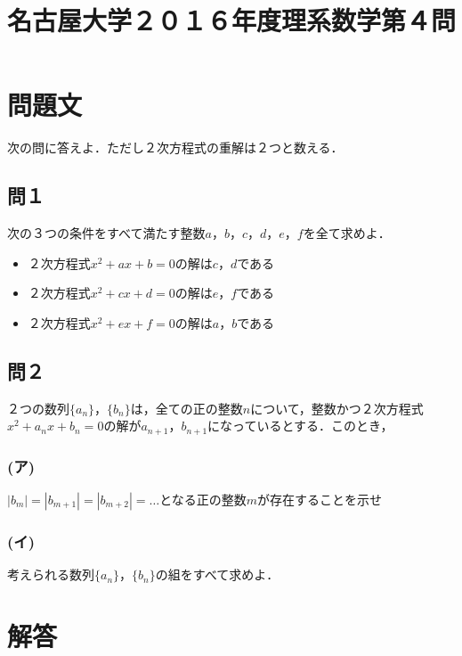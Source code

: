 \documentclass[../main]{subfiles}
\begin{document}
\title{名古屋大学２０１６年度理系数学第４問}
\date{}
\maketitle
\section{問題文}
次の問に答えよ．ただし２次方程式の重解は２つと数える．
\subsection*{問１}
次の３つの条件をすべて満たす整数$a$，$b$，$c$，$d$，$e$，$f$を全て求めよ．
\begin{itemize}
\item ２次方程式$x^{2}+ax+b=0$の解は$c$，$d$である
\item ２次方程式$x^{2}+cx+d=0$の解は$e$，$f$である
\item ２次方程式$x^{2}+ex+f=0$の解は$a$，$b$である
\end{itemize}
\subsection*{問２}
２つの数列$\{a_n\}$，$\{b_n\}$は，全ての正の整数$n$について，整数かつ２次方程式$x^{2}+a_{n}x+b_{n}=0$の解が$a_{n+1}$，$b_{n+1}$になっているとする．このとき，
\subsubsection*{(ア)}$|b_m|=|b_{m+1}|=|b_{m+2}|=\dots$となる正の整数$m$が存在することを示せ
\subsubsection*{(イ)}考えられる数列$\{a_n\}$，$\{b_n\}$の組をすべて求めよ．
\section{解答}
\end{document}
